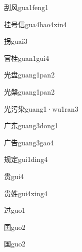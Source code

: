 \begin{verbete}[8;4]{刮风}{gua1feng1}
\end{verbete}
\begin{verbete}[9;5;9]{挂号信}{gua4hao4xin4}
\end{verbete}
\begin{verbete}[8]{拐}{guai3}
\end{verbete}
\begin{verbete}[8;10]{官桂}{guan1gui4}
\end{verbete}
\begin{verbete}[6;11]{光盘}{guang1pan2}
\end{verbete}
\begin{verbete}[6;14]{光槃}{guang1pan2}
\end{verbete}
\begin{verbete}[6;6;9]{光污染}{guang1·wu1ran3}
\end{verbete}
\begin{verbete*}[3;5]{广东}{guang3dong1}
\end{verbete*}
\begin{verbete}[3;7]{广告}{guang3gao4}
\end{verbete}
\begin{verbete}[8;8]{规定}{gui1ding4}
\end{verbete}
\begin{verbete}[9]{贵}{gui4}
\end{verbete}
\begin{verbete}[9;8]{贵姓}{gui4xing4}
\end{verbete}
\begin{verbete*}[6]{过}{guo1}
\end{verbete*}
\begin{verbete}[7]{囯}{guo2}
\end{verbete}
\begin{verbete}[8]{国}{guo2}
\end{verbete}
